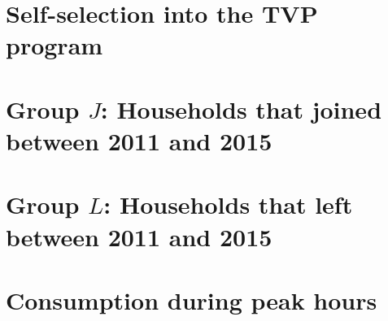 \documentclass[12pt]{article}
\begin{document}
\begin{appendices}

  \startcontents[sections]

  \clearpage

\renewcommand\thefigure{\thesection.\arabic{figure}}

\section{Self-selection into the TVP program}

  \setcounter{figure}{0}

  \label{appendix:appendix_selfSelection}

  

\clearpage

\section{Group $J$: Households that joined between 2011 and 2015}

  \setcounter{figure}{0}

  \label{appendix:appendix_groupJ}

  

\clearpage

\clearpage

\section{Group $L$: Households that left between 2011 and 2015}

  \setcounter{figure}{0}

  \label{appendix:appendix_groupL}

  

\clearpage

\section{Consumption during peak hours}

  \setcounter{figure}{0}

  \label{appendix:appendix_peakConsumption}

  

\clearpage


\end{appendices}
\end{document}
